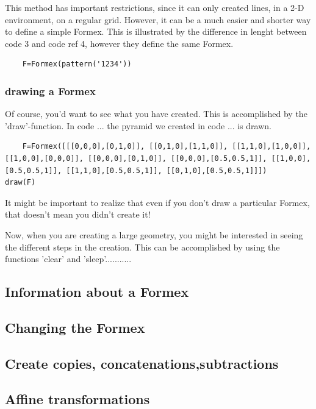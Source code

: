 \documentclass[a4paper]{manual}
\begin{document}
{This method has important restrictions, since it can only created lines, in a 2-D environment, on a regular grid. However, it can be a much easier and shorter way to define a simple Formex. This is illustrated by the difference in lenght between code 3 and code ref 4, however they define the same Formex.
\begin{verbatim}
	F=Formex(pattern('1234'))
\end{verbatim}

\subsubsection{drawing a Formex}

Of course, you'd want to see what you have created. This is accomplished by the 'draw'-function. In code ... the pyramid we created in code ... is drawn.
\begin{verbatim}
	F=Formex([[[0,0,0],[0,1,0]], [[0,1,0],[1,1,0]], [[1,1,0],[1,0,0]], [[1,0,0],[0,0,0]], [[0,0,0],[0,1,0]], [[0,0,0],[0.5,0.5,1]], [[1,0,0],[0.5,0.5,1]], [[1,1,0],[0.5,0.5,1]], [[0,1,0],[0.5,0.5,1]]])
draw(F)
\end{verbatim}
 
It might be important to realize that even if you don't draw a particular Formex, that doesn't mean you didn't create it!

Now, when you are creating a large geometry, you might be interested in seeing the different steps in the creation. This can be accomplished by using the functions 'clear' and 'sleep'...........

\subsection{Information about a Formex}

\subsection{Changing the Formex}\label{changing F}

\subsection{Create copies, concatenations,subtractions}\label{copy F}

\subsection{Affine transformations}

}
\end{document}
